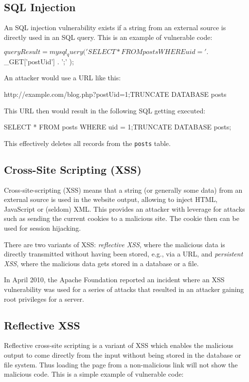 \subsection{SQL Injection}
\label{sql-injection}
An SQL injection vulnerability exists if a string from an external source is directly used in an SQL query. This is an example of vulnerable code:

\begin{phpcode}
$queryResult = mysql_query(
  'SELECT * FROM posts WHERE uid = ' . $_GET['postUid'] . ';'
);
\end{phpcode}

An attacker would use a URL like this:

\begin{textcode}
http://example.com/blog.php?postUid=1;TRUNCATE DATABASE posts
\end{textcode}

This URL then would result in the following SQL getting executed:

\begin{sqlcode}
SELECT * FROM posts WHERE uid = 1;TRUNCATE DATABASE posts;
\end{sqlcode}

This effectively deletes all records from the \texttt{posts} table.


\subsection{Cross-Site Scripting (XSS)}
\label{xss}
Cross-site-scripting (XSS) means that a string (or generally some data) from an external source is used in the website output, allowing to inject HTML, JavaScript or (seldom) XML. This provides an attacker with leverage for attacks such as sending the current cookies to a malicious site. The cookie then can be used for session hijacking.

There are two variants of XSS: \emph{reflective XSS}, where the malicious data is directly transmitted without having been stored, e.g., via a URL, and \emph{persistent XSS}, where the malicious data gets stored in a database or a file.

In April 2010, the Apache Foundation reported an incident where an XSS vulnerability was used for a series of attacks that resulted in an attacker gaining root privileges for a server. \cite{apache-incident-report}


\subsection{Reflective XSS}
Reflective cross-site scripting is a variant of XSS which enables the malicious output to come directly from the input without being stored in the database or file system. Thus loading the page from a non-malicious link will not show the malicious code. This is a simple example of vulnerable code:

